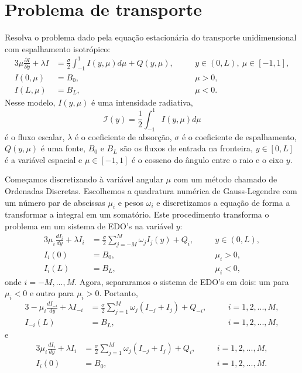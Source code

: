\section{Problema de transporte}
\begin{ex}\label{transp_3}Resolva o problema dado pela equação estacionária do transporte unidimensional com espalhamento isotrópico:
\begin{alignat*}{3}
\mu\frac{\partial I}{\partial y}+\lambda I&=\frac{\sigma}{2}\int_{-1}^1 I(y,\mu)d\mu+Q(y,\mu), & &y\in (0,L),\ \mu\in[-1,1],\\
I(0,\mu)&=B_0, & &\mu>0,\\
I(L,\mu)&=B_L, &\quad &\mu<0.
\end{alignat*}
Nesse modelo, $I(y,\mu)$ é uma intensidade radiativa,
$$
\mathcal{I}(y)=\frac{1}{2}\int_{-1}^1 I(y,\mu)d\mu
$$
é o fluxo escalar, $\lambda$ é o coeficiente de absorção, $\sigma$ é o coeficiente de espalhamento, $Q(y,\mu)$ é uma fonte, $B_0$ e $B_L$ são os fluxos de entrada na fronteira, $y\in[0,L]$ é a variável espacial e $\mu\in[-1,1]$ é o cosseno do ângulo entre o raio e o eixo $y$.
\end{ex}
Começamos discretizando à variável angular $\mu$ com um método chamado de Ordenadas Discretas. Escolhemos a quadratura numérica de Gauss-Legendre com um número par de abscissas $\mu_i$ e pesos $\omega_i$ e discretizamos a equação de forma a transformar a integral em um somatório. Este procedimento transforma o problema em um sistema de EDO's na variável $y$:
\begin{alignat*}{3}
\mu_i \frac{dI_i}{d y}+\lambda I_i&=\frac{\sigma}{2}\sum_{j=-M}^M\omega_jI_j(y)+Q_{ i}, & &y\in (0,L),\\
I_i(0)&=B_0, & &\mu_i>0,\\
I_i(L)&=B_L, &\quad &\mu_i<0,
\end{alignat*}
onde $i=-M,...,M$. Agora, separaramos o sistema de EDO's em dois: um para $\mu_i<0$ e outro para $\mu_i>0$. Portanto,
\begin{alignat*}{3}
-\mu_i\frac{dI_{-i}}{d y}+\lambda I_{-i} &=\frac{\sigma}{2}\sum_{j=1}^{M}\omega_j(I_{-j}+I_{j})+Q_{- i}, &\quad &i=1,2,...,M,\\
I_{-i}(L)&=B_L, &\quad &i=1,2,...,M,
\end{alignat*}
e
\begin{alignat*}{3}
\mu_i \frac{dI_{i}}{d y}+\lambda I_i &=\frac{\sigma}{2}\sum_{j=1}^{M}\omega_j(I_{-j}+I_{j})+Q_{ i}, &\quad &i=1,2,...,M,\\
I_i(0)&=B_0, &\quad &i=1,2,...,M.
\end{alignat*}
